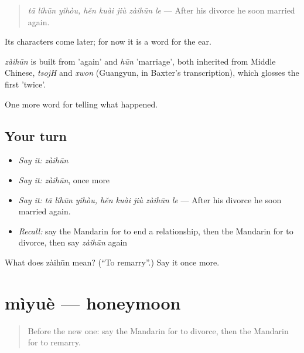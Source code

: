 \begin{quote}
\emph{tā líhūn yǐhòu, hěn kuài jiù zàihūn le} — After his divorce he soon married again.
\end{quote}

Its characters come later; for now it is a word for the ear.

\begin{cousinweb}
\emph{zàihūn} is built from  'again' and \emph{hūn} 'marriage', both inherited from Middle Chinese, \emph{tsojH} and \emph{xwon} (Guangyun, in Baxter's transcription), which glosses the first 'twice'.
\end{cousinweb}

\begin{grammarlens}[title={What you've built}]
One more word for telling what happened.
\end{grammarlens}

\subsection*{Your turn}
\begin{itemize}
\raggedright
  \item \emph{Say it:} \emph{zàihūn}
  \item \emph{Say it:} \emph{zàihūn}, once more
  \item \emph{Say it:} \emph{tā líhūn yǐhòu, hěn kuài jiù zàihūn le} — After his divorce he soon married again.
  \item \emph{Recall:} say the Mandarin for to end a relationship, then the Mandarin for to divorce, then say \emph{zàihūn} again
\end{itemize}

\begin{tcolorbox}[breakable,colback=teal!4,colframe=teal!35!black,title={Before you move on}]
What does zàihūn mean? (\textquotedblleft{}To remarry\textquotedblright{}.) Say it once more.
\end{tcolorbox}
\section[mìyuè]{mìyuè — honeymoon}

\label{lesson:ZH-C307-miyue}



\begin{quote}
Before the new one: say the Mandarin for to divorce, then the Mandarin for to remarry.
\end{quote}

